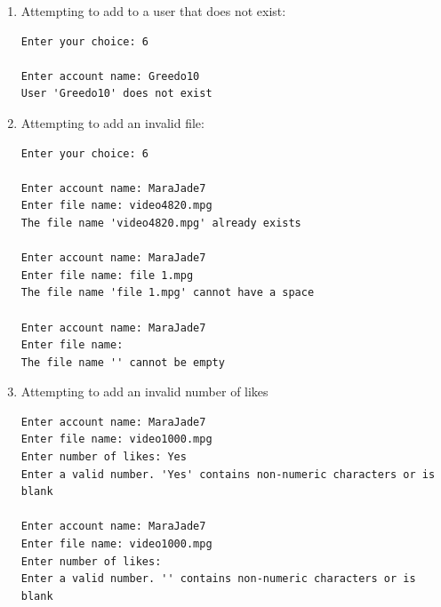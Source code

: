 \documentclass{assignment}
\begin{document}
\begin{enumerate}
\begin{enumerate}
\begin{center}
{\begin{BVerbatim}
Enter account name: GeneralVeers3
Enter file name: video1001.mpg
Enter number of likes: 10
Enter the video description: My first video 
Video 'My first video' from 'video1001.mpg' was successfully added to user 'GeneralVeers3'
\end{BVerbatim} 
} \end{center} \color{black}
Choosing option 5 yields:
\begin{center} 
\small{
\color{gray}
\begin{BVerbatim} 
Enter account name: GeneralVeers3
'My first video' has 10 likes
\end{BVerbatim} 
} \end{center} \color{black}


    \item Attempting to add to a user that does not exist:
    \begin{center} \small { \color{gray}
\begin{BVerbatim} 
Enter your choice: 6

Enter account name: Greedo10
User 'Greedo10' does not exist
\end{BVerbatim} 
} \end{center} \color{black}

\item Attempting to add an invalid file:
\begin{center} \small { \color{gray}
\begin{BVerbatim} 
Enter your choice: 6

Enter account name: MaraJade7
Enter file name: video4820.mpg
The file name 'video4820.mpg' already exists

Enter account name: MaraJade7
Enter file name: file 1.mpg
The file name 'file 1.mpg' cannot have a space

Enter account name: MaraJade7
Enter file name: 
The file name '' cannot be empty
\end{BVerbatim} 
} \end{center} \color{black}

\item Attempting to add an invalid number of likes

\begin{center} \small { \color{gray}
\begin{BVerbatim} 
Enter account name: MaraJade7
Enter file name: video1000.mpg
Enter number of likes: Yes
Enter a valid number. 'Yes' contains non-numeric characters or is blank

Enter account name: MaraJade7
Enter file name: video1000.mpg
Enter number of likes: 
Enter a valid number. '' contains non-numeric characters or is blank
\end{BVerbatim} 
} \end{center} \color{black}


\end{enumerate}
\end{enumerate}
\end{document}
